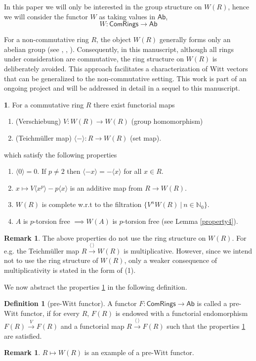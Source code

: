\documentclass[10pt]{amsart}
\theoremstyle{plain}
\theoremstyle{definition}
\newtheorem{remark}[thm]{Remark}
\newtheorem{point}[thm]{}
\newtheorem{definition}[thm]{Definition}
\newcommand{\N}{{\mathbb N}}
\newcommand{\ab}[1]{\langle {#1} \rangle}
\newcommand{\Com}{{\mathsf{ComRings}}}
\begin{document}
\noindent In this paper we will only be interested in the group structure on $W(R)$, hence we will consider the functor $W$ as taking values in $\mathsf{Ab}$,
$$W : \Com \to \mathsf{Ab}$$

\noindent For a non-commutative ring $R$, the object $W(R)$ generally forms only an abelian group (see \cite{dkp}, \cite{h1}, \cite{h2}). Consequently, in this manuscript, although all rings under consideration are commutative, the ring structure on $W(R)$ is deliberately avoided. This approach facilitates a characterization of Witt vectors that can be generalized to the non-commutative setting. This work is part of an ongoing project and will be addressed in detail in a sequel to this manuscript.
 
\begin{point}\label{properties}
\noindent  For a commutative ring $R$ there exist functorial maps
\begin{enumerate}
\item[-] (Verschiebung) $V: W(R)\to W(R)$ (group homomorphism)
\item[-] (Teichm\"{u}ller map) $\langle - \rangle: R \to W(R)$ (set map).
\end{enumerate} 
which satisfy the following properties

\begin{enumerate} 
\item $\ab{0}=0$. If $p\neq 2$ then $\ab{-x} = -\ab{x}$ for all $x \in R$.
\item $x \mapsto V\ab{x^p} -p\ab{x}$ is an additive map from $R \to W(R)$. 
\item $W(R)$ is complete w.r.t to the filtration $\{V^nW(R)\ | \ n \in \N_0 \}$.
\item $A$ is $p$-torsion free $\implies W(A)$ is $p$-torsion free (see Lemma \eqref{property4}).
\end{enumerate}

\end{point}

\begin{remark}The above properties do not use the ring structure on $W(R)$. For e.g. 
the Teichm\"{u}ller map  $R \xrightarrow{\ab{\ }} W(R)$ is multiplicative. However, since we intend not to use the ring structure of $W(R)$, only a weaker consequence of multiplicativity is stated in the form of (1). 
\end{remark}
\noindent We now abstract the properties \ref{properties} in the following definition.

\begin{definition}[pre-Witt functor]
A functor $F:\Com \to \mathsf{Ab}$ is called a pre-Witt functor, if for every $R$, $F(R)$ is endowed with a functorial endomorphism $F(R)\xrightarrow{V}F(R)$ and a functorial map  $R\xrightarrow{\ab{\ }} F(R)$ such that the properties \ref{properties} are satisfied.
\end{definition}
\begin{remark} $R\mapsto W(R)$ is an example of a pre-Witt functor. 
\end{remark}
\end{document}
